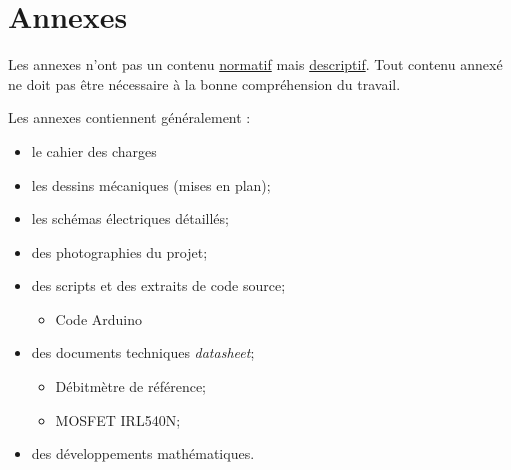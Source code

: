 \documentclass[
    iai & comatec, %
    mi, %
]{heig-tb}
\begin{document}
\clearpage

\printbibliography

\appendix
\appendixpage
\addappheadtotoc

\chapter{Annexes}

Les annexes n'ont pas un contenu \underline{normatif} mais \underline{descriptif}. Tout contenu annexé ne doit pas être nécessaire à la bonne compréhension du travail.

Les annexes contiennent généralement :

\begin{itemize}
    \item le cahier des charges
    \item les dessins mécaniques (mises en plan);
    \item les schémas électriques détaillés;
    \item des photographies du projet;
    \item des scripts et des extraits de code source;
          \begin{itemize}
              \item Code Arduino
          \end{itemize}
    \item des documents techniques \pex \emph{datasheet};
          \begin{itemize}
              \item Débitmètre de référence;
              \item MOSFET IRL540N;
          \end{itemize}
    \item des développements mathématiques.
\end{itemize}

\newpage
\end{document}
